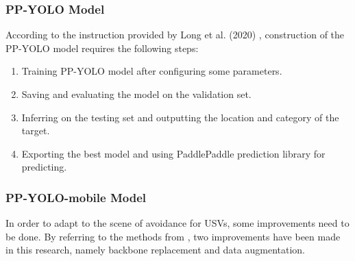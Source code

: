 \documentclass[sensors,article,submit,moreauthors,pdftex]{Definitions/mdpi}
\begin{document}
\subsubsection{PP-YOLO Model}

According to the instruction provided by Long et al. (2020) \cite{long2020pp}, construction of the PP-YOLO model requires the following steps:

\begin{enumerate}
\item Training PP-YOLO model after configuring some parameters.
\item Saving and evaluating the model on the validation set.
\item Inferring on the testing set and outputting the location and category of the target.
\item Exporting the best model and using PaddlePaddle prediction library for predicting.
\end{enumerate}

\subsubsection{PP-YOLO-mobile Model}

In order to adapt to the scene of avoidance for USVs, 
some improvements need to be done. By referring to the methods from \cite{zoph2019learning, mahto2020refining, mandal2020object}, two improvements have been made in this research, namely backbone replacement and data augmentation.
\end{document}
